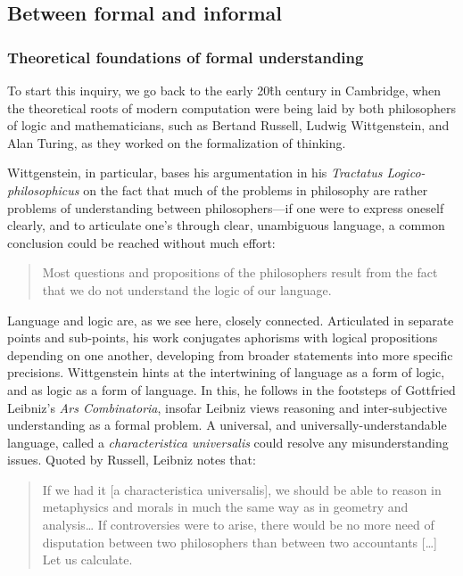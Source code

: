 \subsection{Between formal and informal}
\label{subsec:formal-informal}

\subsubsection{Theoretical foundations of formal understanding}
\label{subsubsec:theoretical-understanding}

To start this inquiry, we go back to the early 20\^{th} century in Cambridge, when the theoretical roots of modern computation were being laid by both philosophers of logic and mathematicians, such as Bertand Russell, Ludwig Wittgenstein, and Alan Turing, as they worked on the formalization of thinking.

Wittgenstein, in particular, bases his argumentation in his \emph{Tractatus Logico-philosophicus} on the fact that much of the problems in philosophy are rather problems of understanding between philosophers—if one were to express oneself clearly, and to articulate one's through clear, unambiguous language, a common conclusion could be reached without much effort:

\begin{quote}
    Most questions and propositions of the philosophers result from the fact that we do not understand the logic of our language. \citep{wittgenstein_tractatus_2010}
\end{quote}

Language and logic are, as we see here, closely connected. Articulated in separate points and sub-points, his work conjugates aphorisms with logical propositions depending on one another, developing from broader statements into more specific precisions. Wittgenstein hints at the intertwining of language as a form of logic, and as logic as a form of language. In this, he follows in the footsteps of Gottfried Leibniz's \emph{Ars Combinatoria}, insofar Leibniz views reasoning and inter-subjective understanding as a formal problem. A universal, and universally-understandable language, called a \emph{characteristica universalis} could resolve any misunderstanding issues. Quoted by Russell, Leibniz notes that:

\begin{quote}
    If we had it [a characteristica universalis], we should be able to reason in metaphysics and morals in much the same way as in geometry and analysis\dots{} If controversies were to arise, there would be no more need of disputation between two philosophers than between two accountants [\dots] Let us calculate. \citep{russell_logical_1950}
\end{quote}


